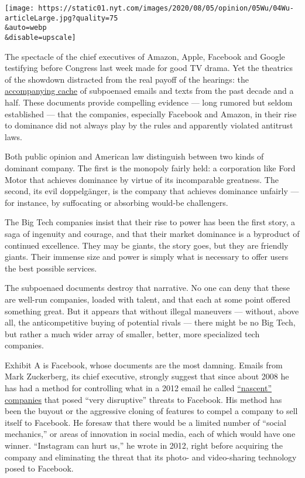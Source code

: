 \texttt{[image: https://static01.nyt.com/images/2020/08/05/opinion/05Wu/04Wu-articleLarge.jpg?quality=75\\\&auto=webp\\\&disable=upscale]}

The spectacle of the chief executives of Amazon, Apple, Facebook and
Google testifying before Congress last week made for good TV drama. Yet
the theatrics of the showdown distracted from the real payoff of the
hearings: the
\href{https://judiciary.house.gov/online-platforms-and-market-power/}{accompanying
cache} of subpoenaed emails and texts from the past decade and a half.
These documents provide compelling evidence --- long rumored but seldom
established --- that the companies, especially Facebook and Amazon, in
their rise to dominance did not always play by the rules and apparently
violated antitrust laws.

Both public opinion and American law distinguish between two kinds of
dominant company. The first is the monopoly fairly held: a corporation
like Ford Motor that achieves dominance by virtue of its incomparable
greatness. The second, its evil doppelgänger, is the company that
achieves dominance unfairly --- for instance, by suffocating or
absorbing would-be challengers.

The Big Tech companies insist that their rise to power has been the
first story, a saga of ingenuity and courage, and that their market
dominance is a byproduct of continued excellence. They may be giants,
the story goes, but they are friendly giants. Their immense size and
power is simply what is necessary to offer users the best possible
services.

The subpoenaed documents destroy that narrative. No one can deny that
these are well-run companies, loaded with talent, and that each at some
point offered something great. But it appears that without illegal
maneuvers --- without, above all, the anticompetitive buying of
potential rivals --- there might be no Big Tech, but rather a much wider
array of smaller, better, more specialized tech companies.

Exhibit A is Facebook, whose documents are the most damning. Emails from
Mark Zuckerberg, its chief executive, strongly suggest that since about
2008 he has had a method for controlling what in a 2012 email he called
\href{https://papers.ssrn.com/sol3/papers.cfm?abstract_id=3624058}{``nascent''
companies} that posed ``very disruptive'' threats to Facebook. His
method has been the buyout or the aggressive cloning of features to
compel a company to sell itself to Facebook. He foresaw that there would
be a limited number of ``social mechanics,'' or areas of innovation in
social media, each of which would have one winner. ``Instagram can hurt
us,'' he wrote in 2012, right before acquiring the company and
eliminating the threat that its photo- and video-sharing technology
posed to Facebook.


